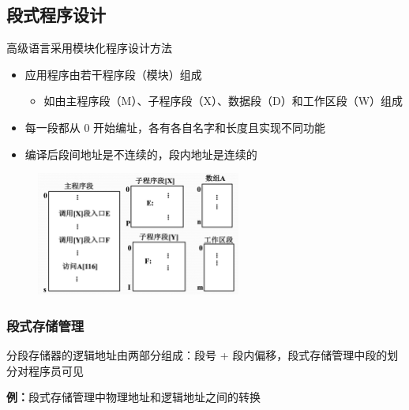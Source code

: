\documentclass[cs4size,a4paper,10pt]{ctexart}
\begin{document}
		\subsection{段式程序设计}
		高级语言采用模块化程序设计方法
		\begin{itemize}
			\item 应用程序由若干程序段（模块）组成
			\begin{itemize}
				\item 如由主程序段（M）、子程序段（X）、数据段（D）和工作区段（W）组成
			\end{itemize}
			\item 每一段都从 0 开始编址，各有各自名字和长度且实现不同功能
			\item 编译后段间地址是不连续的，段内地址是连续的
		\end{itemize}
		\begin{figure}[H]
			\centering
			\includegraphics[width=0.6\textwidth]{img/3.4.1.1}
		\end{figure}

		\subsubsection{段式存储管理}
		分段存储器的逻辑地址由两部分组成：段号 + 段内偏移，段式存储管理中段的划分对程序员可见

		\textbf{例：}段式存储管理中物理地址和逻辑地址之间的转换
		\begin{figure}[H]
			\centering
		\end{figure}
\end{document}
